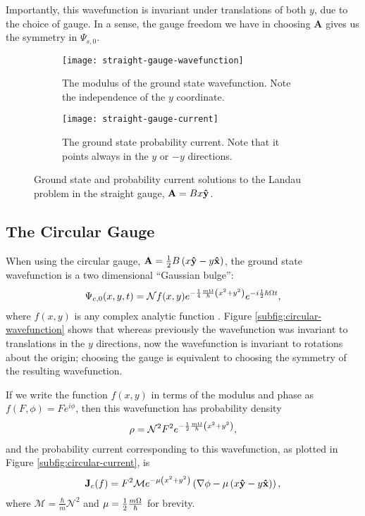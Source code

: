 Importantly, this wavefunction is invariant under translations of both $y$, due to the choice of gauge. In a sense, the gauge freedom we have in
choosing $\mathbf{A}$ gives us the symmetry in $\Psi_{s,0}$.

\begin{figure}
    \centering
    \begin{subfigure}{0.45\linewidth}
        \centering
        \texttt{[image: straight-gauge-wavefunction]}
        \caption{The modulus of the ground state wavefunction. Note the
            independence of the $y$ coordinate.}
        \label{subfig:straight-wavefunction}
    \end{subfigure}
    \begin{subfigure}{0.45\linewidth}
        \centering
        \texttt{[image: straight-gauge-current]}
        \caption{The ground state probability current. Note that it points
            always in the $y$ or $-y$ directions.}
        \label{subfig:straight-current}
    \end{subfigure}
    \caption{Ground state and probability current solutions to the Landau
    problem in the straight gauge, $\mathbf{A} = Bx\mathbf{\hat y }$.}
    \label{fig:straight}
\end{figure}

\subsection{The Circular Gauge}

When using the circular gauge, $\mathbf{A} = \frac{1}{2} B \left( x \mathbf{\hat y } -
y \mathbf{\hat x } \right)$, the ground state wavefunction is a two dimensional
``Gaussian bulge'':
\begin{align}
    \Psi_{c,0}(x, y, t) = \mathcal{N} f(x,y) e^{- \frac{1}{4} \frac{m \Omega}{\hbar} \left( x^2 +
        y^2 \right)} e^{-i \frac{1}{2} \hbar \Omega t},
\end{align}
where $f(x,y)$ is any complex analytic function \cite{murayama}. Figure
\ref{subfig:circular-wavefunction} shows that whereas previously the
wavefunction was invariant to translations in the $y$ directions, now the
wavefunction is invariant to rotations about the origin; choosing the gauge is
equivalent to choosing the symmetry of the resulting wavefunction.

If we write the function $f(x,y)$ in terms of the modulus and phase as
$f(F,\phi) = Fe^{i \phi}$, then this wavefunction has probability density
\begin{align}
    \rho = \mathcal{N}^2 F^2 e^{- \frac{1}{2} \frac{m \Omega}{\hbar} \left( x^2 + y^2 \right)},
    \label{eqn:circular-density}
\end{align}
and the probability current corresponding to this wavefunction, as plotted in
Figure \ref{subfig:circular-current}, is
\begin{align}
    \mathbf{J}_c(f) = F^2 \mathcal{M} e^{- \mu
        \left( x^2 + y^2 \right)} \left( \nabla \phi - \mu \left(
        x\mathbf{\hat y } - y\mathbf{\hat x } \right) \right),
\end{align}
where $\mathcal{M} = \frac{\hbar}{m} \mathcal{N}^2$ and $\mu = \frac{1}{2}
\frac{m \Omega}{\hbar}$ for brevity.

